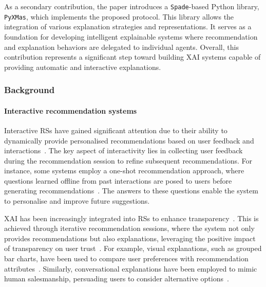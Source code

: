 As a secondary contribution, the paper introduces a \texttt{Spade}-based Python library, \texttt{PyXMas}, which implements the proposed protocol.
%
This library allows the integration of various explanation strategies and representations.
%
It serves as a foundation for developing intelligent explainable systems where recommendation and explanation behaviors are delegated to individual agents.
%
Overall, this contribution represents a significant step toward building \gls{XAI} systems capable of providing automatic and interactive explanations.


\subsubsection{Background}\label{subsubsec:background-general-purpose-protocol-for-multi-agent-based-explanations}
%
\paragraph{Interactive recommendation systems}
%
Interactive \glspl{RS} have gained significant attention due to their ability to dynamically provide personalised recommendations based on user feedback and interactions~\cite{citation_needed}.
%
The key aspect of interactivity lies in collecting user feedback during the recommendation session to refine subsequent recommendations.
%
For instance, some systems employ a one-shot recommendation approach, where questions learned offline from past interactions are posed to users before generating recommendations~\cite{citation_needed}.
%
The answers to these questions enable the system to personalise and improve future suggestions.

\Gls{XAI} has been increasingly integrated into \glspl{RS} to enhance transparency~\cite{citation_needed}.
%
This is achieved through iterative recommendation sessions, where the system not only provides recommendations but also explanations, leveraging the positive impact of transparency on user trust~\cite{citation_needed}.
%
For example, visual explanations, such as grouped bar charts, have been used to compare user preferences with recommendation attributes~\cite{citation_needed}.
%
Similarly, conversational explanations have been employed to mimic human salesmanship, persuading users to consider alternative options~\cite{citation_needed}.


